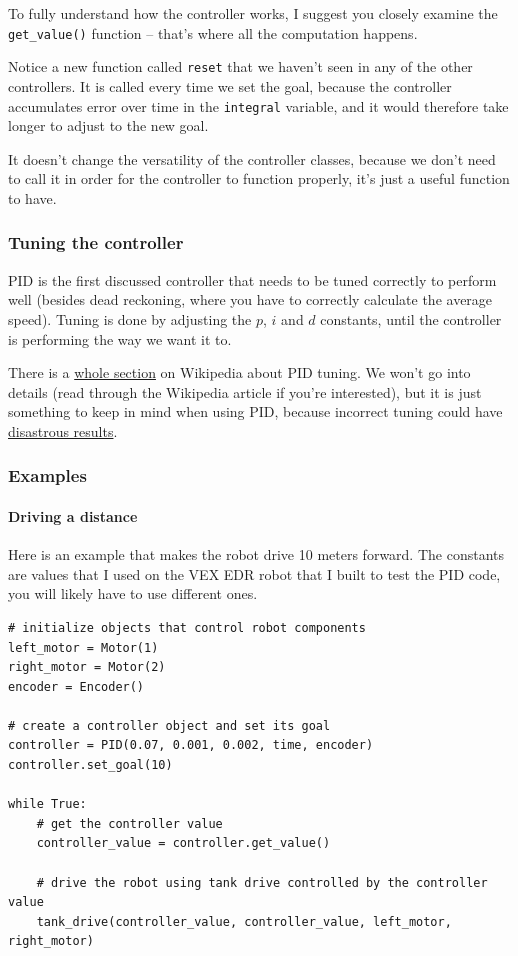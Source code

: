 \documentclass[12pt,twoside]{article}
\let\subsubsubsection\paragraph
\begin{document}
To fully understand how the controller works, I suggest you closely examine the \texttt{get\_value()} function -- that's where all the computation happens.

Notice a new function called \texttt{reset} that we haven't seen in any of the other controllers. It is called every time we set the goal, because the controller accumulates error over time in the \texttt{integral} variable, and it would therefore take longer to adjust to the new goal.

It doesn't change the versatility of the controller classes, because we don't need to call it in order for the controller to function properly, it's just a useful function to have.


\subsubsection{Tuning the controller}
PID is the first discussed controller that needs to be tuned correctly to perform well (besides dead reckoning, where you have to correctly calculate the average speed). Tuning is done by adjusting the $p$, $i$ and $d$ constants, until the controller is performing the way we want it to.

There is a \href{https://en.wikipedia.org/wiki/PID_controller#Loop_tuning}{whole section} on Wikipedia about PID tuning. We won't go into details (read through the Wikipedia article if you're interested), but it is just something to keep in mind when using PID, because incorrect tuning could have \href{https://www.youtube.com/watch?v=MxALJU_hp34}{disastrous results}.


\subsubsection{Examples}

\subsubsubsection{Driving a distance}
Here is an example that makes the robot drive 10 meters forward. The constants are values that I used on the VEX EDR robot that I built to test the PID code, you will likely have to use different ones.

\begin{verbatim}
# initialize objects that control robot components
left_motor = Motor(1)
right_motor = Motor(2)
encoder = Encoder()

# create a controller object and set its goal
controller = PID(0.07, 0.001, 0.002, time, encoder)
controller.set_goal(10)

while True:
    # get the controller value
    controller_value = controller.get_value()

    # drive the robot using tank drive controlled by the controller value
    tank_drive(controller_value, controller_value, left_motor, right_motor)
\end{verbatim}
\end{document}
